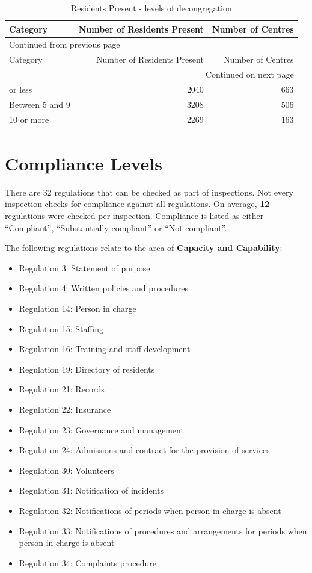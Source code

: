 \documentclass[a4paper,11pt,twoside]{article}
\begin{document}
\begin{longtable}{lrr}
\caption{Residents Present - levels of decongregation}
\\[0pt]
Category & Number of Residents Present & Number of Centres\\[0pt]
\hline
\endfirsthead
\multicolumn{3}{l}{Continued from previous page} \\[0pt]
\hline

Category & Number of Residents Present & Number of Centres \\[0pt]

\hline
\endhead
\hline\multicolumn{3}{r}{Continued on next page} \\
\endfoot
\endlastfoot
\hline
4 or less & 2040 & 663\\[0pt]
Between 5 and 9 & 3208 & 506\\[0pt]
10 or more & 2269 & 163\\[0pt]
\end{longtable}


\clearpage
\section{Compliance Levels}
\label{sec:orgaf9a437}
There are 32 regulations that can be checked as part of inspections. Not every inspection checks for compliance against all regulations. On average, \textbf{12} regulations were checked per inspection. Compliance is listed as either ``Compliant'', ``Substantially compliant'' or ``Not compliant''.

The following regulations relate to the area of \textbf{Capacity and Capability}:

\begin{itemize}
\item Regulation 3: Statement of purpose
\item Regulation 4: Written policies and procedures
\item Regulation 14: Person in charge
\item Regulation 15: Staffing
\item Regulation 16: Training and staff development
\item Regulation 19: Directory of residents
\item Regulation 21: Records
\item Regulation 22: Insurance
\item Regulation 23: Governance and management
\item Regulation 24: Admissions and contract for the provision of services
\item Regulation 30: Volunteers
\item Regulation 31: Notification of incidents
\item Regulation 32: Notifications of periods when person in charge is absent
\item Regulation 33: Notifications of procedures and arrangements for periods when person in charge is absent
\item Regulation 34: Complaints procedure
\end{itemize}
\end{document}
